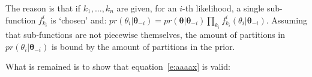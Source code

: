 The reason is that if  $k_1, \ldots, k_n$ are given, for an $i$-th likelihood, a single sub-function $f^i_{k_i}$ is `chosen' and:
$pr(\theta_i | \boldsymbol\theta_{-i}) = 
pr(\boldsymbol\theta | \boldsymbol\theta_{-i})\prod_{k_i} f^i_{k_i}(\theta_i | \boldsymbol\theta_{-i})$.
Assuming that sub-functions are not piecewise themselves, 
the amount  of partitions in $pr(\theta_i | \boldsymbol\theta_{-i})$ is bound by the amount of partitions in the prior.

What is remained is to show that equation~\ref{e:aaaax} is valid:

